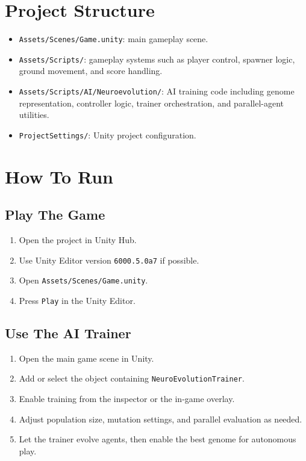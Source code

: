 \documentclass[11pt]{article}
\begin{document}
\section{Project Structure}
\begin{itemize}[leftmargin=1.5em]
    \item \texttt{Assets/Scenes/Game.unity}: main gameplay scene.
    \item \texttt{Assets/Scripts/}: gameplay systems such as player control, spawner logic, ground movement, and score handling.
    \item \texttt{Assets/Scripts/AI/Neuroevolution/}: AI training code including genome representation, controller logic, trainer orchestration, and parallel-agent utilities.
    \item \texttt{ProjectSettings/}: Unity project configuration.
\end{itemize}

\section{How To Run}
\subsection{Play The Game}
\begin{enumerate}[leftmargin=1.5em]
    \item Open the project in Unity Hub.
    \item Use Unity Editor version \texttt{6000.5.0a7} if possible.
    \item Open \texttt{Assets/Scenes/Game.unity}.
    \item Press \texttt{Play} in the Unity Editor.
\end{enumerate}

\subsection{Use The AI Trainer}
\begin{enumerate}[leftmargin=1.5em]
    \item Open the main game scene in Unity.
    \item Add or select the object containing \texttt{NeuroEvolutionTrainer}.
    \item Enable training from the inspector or the in-game overlay.
    \item Adjust population size, mutation settings, and parallel evaluation as needed.
    \item Let the trainer evolve agents, then enable the best genome for autonomous play.
\end{enumerate}
\end{document}
